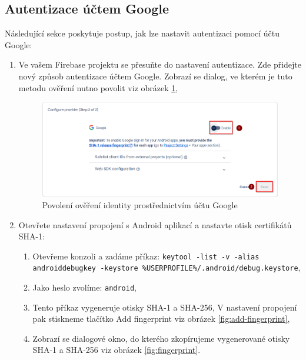 \documentclass[czech, bc, kiv, he, iso690numb]{fasthesis}
\begin{document}
\subsection{Autentizace účtem Google}

Následující sekce poskytuje postup, jak lze nastavit autentizaci pomocí účtu Google:

\begin{enumerate}
    \item Ve vašem Firebase projektu se přesuňte do nastavení autentizace. Zde přidejte nový způsob autentizace účtem Google. Zobrazí se dialog, ve kterém je tuto metodu ověření nutno povolit viz obrázek \ref{fig:enabling-google-sign-in},  

    \begin{figure}[h!]
    \centering
    \includegraphics[width=1\textwidth]{img/BP-Runt/firebase-configuration/google-sign-in/enabling-google-sign-in.png}
    \caption{Povolení ověření identity prostřednictvím účtu Google}
    \label{fig:enabling-google-sign-in}
    \end{figure}

    \item Otevřete nastavení propojení s Android aplikací a nastavte otisk certifikátů \gls{SHA}-1:
      \begin{enumerate}
        \item Otevřeme konzoli a zadáme příkaz: \newline\noindent\texttt{keytool -list -v -alias androiddebugkey -keystore \newline \%USERPROFILE\%/.android/debug.keystore},
        \item Jako heslo zvolíme: \texttt{android},
        \item Tento příkaz vygeneruje otisky \gls{SHA}-1 a \gls{SHA}-256,
        V nastavení propojení pak stiskneme tlačítko Add fingerprint viz obrázek \ref{fig:add-fingerprint},
        \item Zobrazí se dialogové okno, do kterého zkopírujeme vygenerované otisky \gls{SHA}-1 a \gls{SHA}-256 viz obrázek \ref{fig:fingerprint}. 


\end{enumerate}
\end{enumerate}
\end{document}
